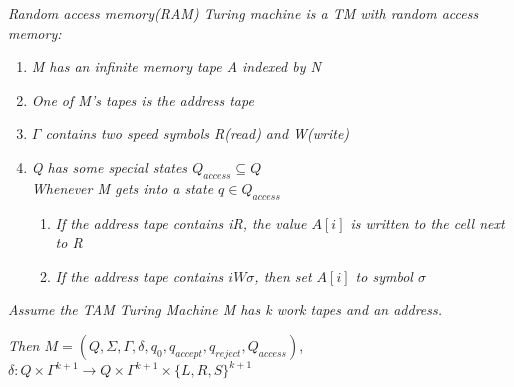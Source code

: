 \documentclass{article}
\begin{document}
\begin{defn}
    \textit{Random access memory(RAM) Turing machine is a TM with random access memory:}

    \begin{enumerate}
        \item \textit{M has an infinite memory tape A indexed by N}
        \item \textit{One of M's tapes is the address tape}
        \item \textit{$\varGamma$ contains two speed symbols R(read) and W(write)}
        \item \textit{Q has some special states $Q_{access}\subseteq Q$\\Whenever M gets into a state $q\in Q_{access}$}
        \begin{enumerate}
            \item \textit{If the address tape contains iR, the value $A[i]$ is written to the cell next to R}
            \item \textit{If the address tape contains $iW\sigma$, then set $A[i]$ to symbol $\sigma$}
        \end{enumerate}
    \end{enumerate}

    \textit{Assume the TAM Turing Machine M has k work tapes and an address.}
    
    \textit{Then $M = (Q,\Sigma,\varGamma,\delta,q_0,q_{accept},q_{reject},Q_{access})$}, $\delta:Q\times\varGamma^{k+1}\rightarrow Q\times\varGamma^{k+1}\times\{L,R,S\}^{k+1}$
\end{defn}
\end{document}

